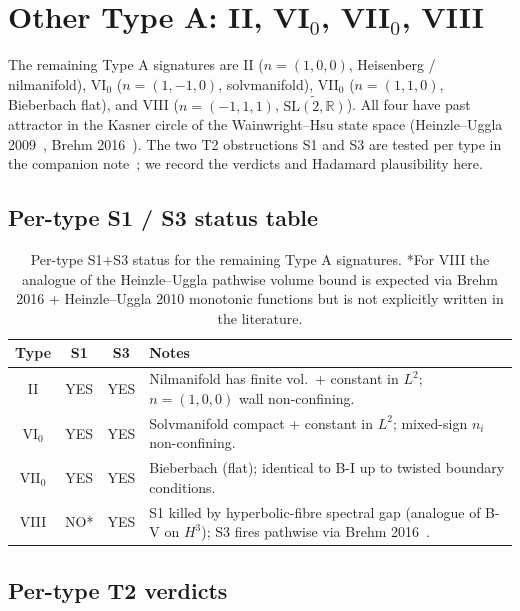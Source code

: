 \documentclass[11pt]{article}
\theoremstyle{definition}
\newcommand{\R}{\mathbb{R}}
\begin{document}
\section{\texorpdfstring{Other Type A: II, VI$_0$, VII$_0$, VIII}{Other Type A: II, VI\_0, VII\_0, VIII}}\label{sec:typeA-other}

The remaining Type A signatures are II ($n=(1,0,0)$, Heisenberg / nilmanifold), VI$_0$ ($n=(1,-1,0)$, solvmanifold), VII$_0$ ($n=(1,1,0)$, Bieberbach flat), and VIII ($n=(-1,1,1)$, $\widetilde{\mathrm{SL}(2,\R)}$). All four have past attractor in the Kasner circle of the Wainwright--Hsu state space (Heinzle--Uggla 2009~\cite{HeinzleUgglaAttractor2009}, Brehm 2016~\cite{Brehm2016}). The two T2 obstructions S1 and S3 are tested per type in the companion note~\cite{T2_bianchi_typeA_note}; we record the verdicts and Hadamard plausibility here.

\subsection{Per-type S1 / S3 status table}\label{sec:typeA-status}

\begin{table}[ht]
\centering
\begin{tabular}{|c|c|c|p{8cm}|}
\hline
Type   & S1 & S3 & Notes \\
\hline
II      & YES & YES & Nilmanifold has finite vol.\ + constant in $L^2$; $n=(1,0,0)$ wall non-confining. \\
VI$_0$  & YES & YES & Solvmanifold compact + constant in $L^2$; mixed-sign $n_i$ non-confining. \\
VII$_0$ & YES & YES & Bieberbach (flat); identical to B-I up to twisted boundary conditions. \\
VIII    & NO* & YES & S1 killed by hyperbolic-fibre spectral gap (analogue of B-V on $H^3$); S3 fires pathwise via Brehm 2016~\cite{Brehm2016}. \\
\hline
\end{tabular}
\caption{Per-type S1+S3 status for the remaining Type A signatures. *For VIII the analogue of the Heinzle--Uggla pathwise volume bound is expected via Brehm 2016 + Heinzle--Uggla 2010 monotonic functions but is not explicitly written in the literature.}
\label{tab:typeA-S1S3}
\end{table}

\subsection{Per-type T2 verdicts}\label{sec:typeA-verdicts}
\end{document}
